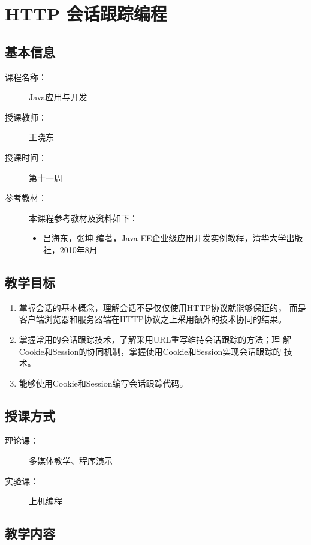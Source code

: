 \chapter{HTTP 会话跟踪编程}
\label{chp:JavaEE-HTTP-session}

\section*{基本信息}
\sline
\begin{description}
\item[课程名称：] Java应用与开发
\item[授课教师：] 王晓东
\item[授课时间：] 第十一周
\item[参考教材：] 本课程参考教材及资料如下：
  \begin{itemize}
  \item 吕海东，张坤 编著，Java EE企业级应用开发实例教程，清华大学出版社，2010年8月
  \end{itemize}
\end{description}

\section*{教学目标}

\sline

\begin{enumerate}
\item 掌握会话的基本概念，理解会话不是仅仅使用HTTP协议就能够保证的，
  而是客户端浏览器和服务器端在HTTP协议之上采用额外的技术协同的结果。
\item 掌握常用的会话跟踪技术，了解采用URL重写维持会话跟踪的方法；理
  解Cookie和Session的协同机制，掌握使用Cookie和Session实现会话跟踪的
  技术。
\item 能够使用Cookie和Session编写会话跟踪代码。
\end{enumerate}  


\section*{授课方式}

\sline
\begin{description}
\item[理论课：] 多媒体教学、程序演示
\item[实验课：] 上机编程
\end{description}

\newpage
\section*{教学内容}
\sline

